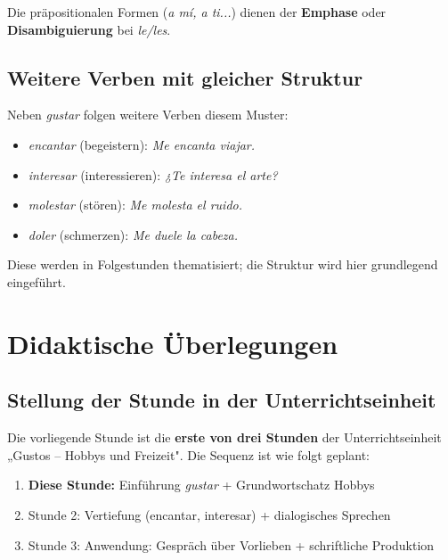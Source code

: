 \documentclass[11pt, a4paper]{article}
\newcommand{\es}[1]{\textcolor{spanisch}{\textit{#1}}}
\begin{document}
Die präpositionalen Formen (\es{a mí, a ti...}) dienen der \textbf{Emphase} oder \textbf{Disambiguierung} bei \es{le/les}.

\subsection{Weitere Verben mit gleicher Struktur}

Neben \es{gustar} folgen weitere Verben diesem Muster:
\begin{itemize}[leftmargin=2em]
    \item \es{encantar} (begeistern): \es{Me encanta viajar.}
    \item \es{interesar} (interessieren): \es{¿Te interesa el arte?}
    \item \es{molestar} (stören): \es{Me molesta el ruido.}
    \item \es{doler} (schmerzen): \es{Me duele la cabeza.}
\end{itemize}

Diese werden in Folgestunden thematisiert; die Struktur wird hier grundlegend eingeführt.


\section{Didaktische Überlegungen}

\subsection{Stellung der Stunde in der Unterrichtseinheit}

Die vorliegende Stunde ist die \textbf{erste von drei Stunden} der Unterrichtseinheit „Gustos -- Hobbys und Freizeit". Die Sequenz ist wie folgt geplant:

\begin{enumerate}[leftmargin=2em]
    \item \textbf{Diese Stunde:} Einführung \es{gustar} + Grundwortschatz Hobbys
    \item Stunde 2: Vertiefung (encantar, interesar) + dialogisches Sprechen
    \item Stunde 3: Anwendung: Gespräch über Vorlieben + schriftliche Produktion
\end{enumerate}
\end{document}
